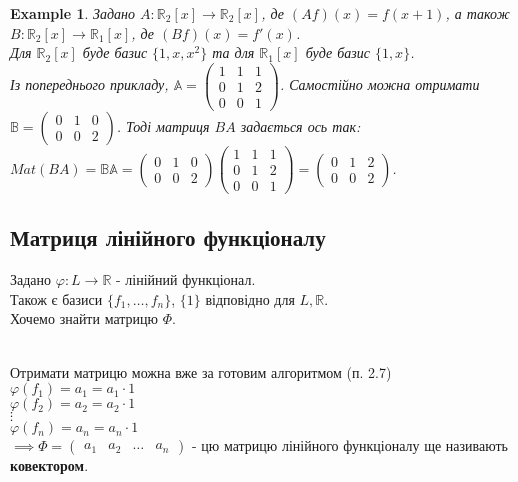 \documentclass[a4paper, 10pt]{article}
\theoremstyle{theoremdd}
\newtheorem{example}[theorem]{Example}
\begin{document}
	\begin{example}
	Задано $A: \mathbb{R}_2[x] \to \mathbb{R}_2[x]$, де $(Af)(x) = f(x+1)$, а також $B: \mathbb{R}_2[x] \to \mathbb{R}_1[x]$, де $(Bf)(x) = f'(x)$.\\
	Для $\mathbb{R}_2[x]$ буде базис $\{1,x,x^2\}$ та для $\mathbb{R}_1[x]$ буде базис $\{1,x\}$.\\
	Із попереднього прикладу, $\mathbb{A} = \begin{pmatrix}
	1 & 1 & 1 \\
	0 & 1 & 2 \\
	0 & 0 & 1
	\end{pmatrix}$. Самостійно можна отримати $\mathbb{B} = \begin{pmatrix}
	0 & 1 & 0 \\
	0 & 0 & 2
	\end{pmatrix}$. Тоді матриця $BA$ задається ось так:\\
	$Mat (BA) = \mathbb{B} \mathbb{A} =  \begin{pmatrix}
	0 & 1 & 0 \\
	0 & 0 & 2
	\end{pmatrix} \begin{pmatrix}
	1 & 1 & 1 \\
	0 & 1 & 2 \\
	0 & 0 & 1
	\end{pmatrix} = \begin{pmatrix}
	0 & 1 & 2 \\
	0 & 0 & 2
	\end{pmatrix}$.
	\end{example}	
	
	\subsection{Матриця лінійного функціоналу}
	Задано $\varphi: L \to \mathbb{R}$ - лінійний функціонал.\\
	Також є базиси $\{f_1,\dots,f_n\}$, $\{1\}$ відповідно для $L,\mathbb{R}$.\\
	Хочемо знайти матрицю $\Phi$.\\
	\\
Отримати матрицю можна вже за готовим алгоритмом (п. 2.7)\\
	$\varphi(f_1) = a_1 = a_1 \cdot 1$\\
	$\varphi(f_2) = a_2 = a_2 \cdot 1$\\
	$\vdots$\\
	$\varphi(f_n) = a_n = a_n \cdot 1$\\
	$\implies \Phi = \begin{pmatrix} a_1 & a_2 & \dots & a_n \end{pmatrix}$ - цю матрицю лінійного функціоналу ще називають \textbf{ковектором}.
	
\end{document}
